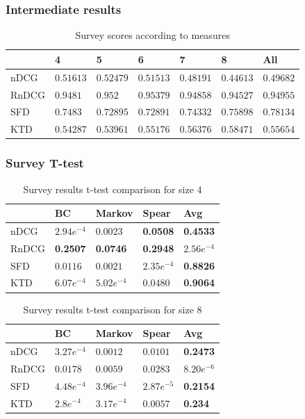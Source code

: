 \begin{frame}
\frametitle{Intermediate results}
\begin{table}[H]
	\centering
	\begin{tabular}{|l|llllll|} \hline
		& 4 & 5 & 6 & 7 & 8 & All \\ \hline
		nDCG	& $0.51613$	& $0.52479$	& $0.51513$	& $0.48191$ & $0.44613$ & $0.49682$ \\
		RnDCG	& $0.9481$	& $0.952$	& $0.95379$	& $0.94858$ & $0.94527$ & $0.94955$ \\
		SFD	& $0.7483$	& $0.72895$	& $0.72891$	& $0.74332$ & $0.75898$ & $0.78134$ \\
		KTD	& $0.54287$	& $0.53961$	& $0.55176$	& $0.56376$ & $0.58471$ & $0.55654$ \\ \hline
	\end{tabular}
	\caption{Survey scores according to measures}
\end{table}
\end{frame}

\begin{frame}
\frametitle{Survey T-test}
\begin{table}[H]
	\centering
	\begin{tabular}{|l|llll|}\hline
		& BC & Markov & Spear & Avg \\ \hline
		nDCG	& $2.94e^{-4}$	& $0.0023$	& \textbf{0.0508}	& \textbf{0.4533} \\
		RnDCG	& \textbf{0.2507}	& \textbf{0.0746}	& \textbf{0.2948}	& $2.56e^{-4}$ \\
		SFD	& $0.0116$	& $0.0021$ 	& $2.35e^{-4}$	& \textbf{0.8826} \\
		KTD	& $6.07e^{-4}$	& $5.02e^{-4}$ 	& $0.0480$	& \textbf{0.9064} \\ \hline
	\end{tabular}
	\caption{Survey results t-test comparison for size 4}
\end{table}

\begin{table}[H]
	\centering
	\begin{tabular}{|l|llll|}\hline
		& BC & Markov & Spear & Avg \\ \hline
		nDCG	& $3.27e^{-4}$	& $0.0012$	& $0.0101$	& \textbf{0.2473} \\
		RnDCG	& $0.0178$	& $0.0059$	& $0.0283$	& $8.20e^{-6}$ \\
		SFD	& $4.48e^{-4}$	& $3.96e^{-4}$ 	& $2.87e^{-5}$	& \textbf{0.2154} \\
		KTD	& $2.8e^{-4}$	& $3.17e^{-4}$ 	& $0.0057$	& \textbf{0.234} \\ \hline
	\end{tabular}
	\caption{Survey results t-test comparison for size 8}
\end{table}
\end{frame}